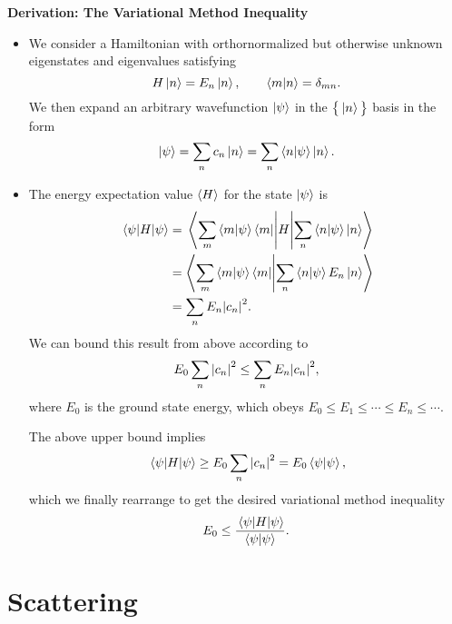 \documentclass[11pt, a4paper]{article}
\newcommand{\Ham}{Hamiltonian\xspace}
\newcommand{\p}{\psi}  %
\begin{document}
\textbf{Derivation: The Variational Method Inequality}
\begin{itemize}
    \item We consider a \Ham with orthornormalized but otherwise unknown eigenstates and eigenvalues satisfying
    \begin{equation*}
        H \ket{n} = E_{n}\ket{n}, \qquad \braket{m}{n} = \delta_{mn}.
    \end{equation*}
    We then expand an arbitrary wavefunction $ \ket{\psi} $ in the $ \big\{ \ket{n} \big\} $ basis in the form
    \begin{equation*}
        \ket{\psi} = \sum_{n} c_{n}\ket{n} = \sum_{n} \braket{n}{\p}\ket{n}.
    \end{equation*}
    
    \item The energy expectation value $ \ev{H} $ for the state $ \ket{\psi} $ is
    \begin{align*}
        \mel{\psi}{H}{\psi} &= \mel{\sum_{m} \braket{m}{\p}\bra{m}}{H}{\sum_{n} \braket{n}{\p}\ket{n}}\\
        & = \braket{\sum_{m} \braket{m}{\p}\bra{m}}{\sum_{n} \braket{n}{\p}E_{n}\ket{n}}\\
        &= \sum_{n} E_{n}\abs{c_{n}}^{2}.
    \end{align*}
    We can bound this result from above according to
    \begin{equation*}
        E_{0}\sum_{n} \abs{c_{n}}^{2} \leq \sum_{n} E_{n}\abs{c_{n}}^{2},
    \end{equation*}
    where $ E_{0} $ is the ground state energy, which obeys $ E_{0} \leq E_{1} \leq \cdots \leq E_{n} \leq \cdots $. 

    The above upper bound implies
    \begin{equation*}
        \mel{\psi}{H}{\psi} \geq E_{0} \sum_{n}\abs{c_{n}}^{2} = E_{0} \braket{\psi}{\psi},
    \end{equation*}
    which we finally rearrange to get the desired variational method inequality
    \begin{equation*}
        E_{0} \leq \frac{\mel{\psi}{H}{\psi}}{\braket{\psi}{\psi}}.
    \end{equation*}
    
\end{itemize}

\newpage	
\section{Scattering}
\end{document}
